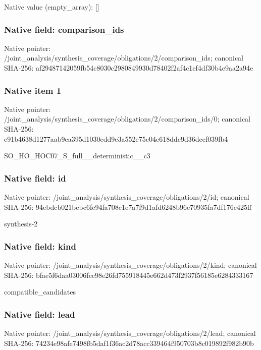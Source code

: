 \documentclass[10pt,a4paper]{article}
\begin{document}
Native value (empty\_\allowbreak{}array): []

\subsubsection{Native field: comparison\_\allowbreak{}ids}
Native pointer: /joint\_\allowbreak{}analysis/synthesis\_\allowbreak{}coverage/obligations/2/comparison\_\allowbreak{}ids; canonical SHA-256: af29487142059fb54c8030c2980849930d78402f2af4c1ef4df30b4e9aa2a94e

\subsubsection{Native item 1}
Native pointer: /joint\_\allowbreak{}analysis/synthesis\_\allowbreak{}coverage/obligations/2/comparison\_\allowbreak{}ids/0; canonical SHA-256: e91b4638d1277aab9ea395d1030edd9e3a552e75c04c618ddc9d36dcef039fb4

\begingroup\raggedright\sloppy SO\_\allowbreak{}HO\_\allowbreak{}HOC07\_\allowbreak{}S\_\allowbreak{}full\_\allowbreak{}\_\allowbreak{}deterministic\_\allowbreak{}\_\allowbreak{}c3\par\endgroup

\subsubsection{Native field: id}
Native pointer: /joint\_\allowbreak{}analysis/synthesis\_\allowbreak{}coverage/obligations/2/id; canonical SHA-256: 94ebdcb021bcbc6fc94fa708c1e7a7f9d1afd6248b96e70935fa7df176e425ff

\begingroup\raggedright\sloppy synthesis-2\par\endgroup

\subsubsection{Native field: kind}
Native pointer: /joint\_\allowbreak{}analysis/synthesis\_\allowbreak{}coverage/obligations/2/kind; canonical SHA-256: bfae5f6daa03006fec98e26fd755918445e662d473f2937f56185e6284333167

\begingroup\raggedright\sloppy compatible\_\allowbreak{}candidates\par\endgroup

\subsubsection{Native field: lead}
Native pointer: /joint\_\allowbreak{}analysis/synthesis\_\allowbreak{}coverage/obligations/2/lead; canonical SHA-256: 74234e98afe7498fb5daf1f36ac2d78acc339464f950703b8c019892f982b90b
\end{document}
